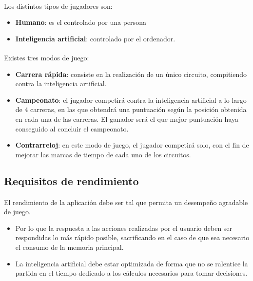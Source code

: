 \paragraph{}
Los distintos tipos de jugadores son:

\begin{itemize}
    \item \textbf{Humano}: es el controlado por una persona
    \item \textbf{Inteligencia artificial}: controlado por el ordenador.
\end{itemize}

\paragraph{}
Existes tres modos de juego:

\begin{itemize}
	\item \textbf{Carrera rápida}: consiste en la realización de un único circuito, compitiendo contra la inteligencia artificial.
	\item \textbf{Campeonato}: el jugador competirá contra la inteligencia artificial a lo largo de 4 carreras, en las que obtendrá una puntuación
	según la posición obtenida en cada una de las carreras. El ganador será el que mejor puntuación haya conseguido al concluir
	el campeonato.
	\item \textbf{Contrarreloj}: en este modo de juego, el jugador competirá solo, con el fin de mejorar las marcas de tiempo de cada uno de los 
	circuitos.
\end{itemize}


\subsection{Requisitos de rendimiento}

\paragraph{}
El rendimiento de la aplicación debe ser tal que permita un desempeño agradable de juego. 

\begin{itemize}
    \item Por lo que la respuesta a las acciones realizadas por el usuario deben ser respondidas lo más rápido posible,
    sacrificando en el caso de que sea necesario el consumo de la memoria principal.
    
    \item La inteligencia artificial debe estar optimizada de forma que no se ralentice la partida en el tiempo dedicado a los
    cálculos necesarios para tomar decisiones.
\end{itemize}
    

